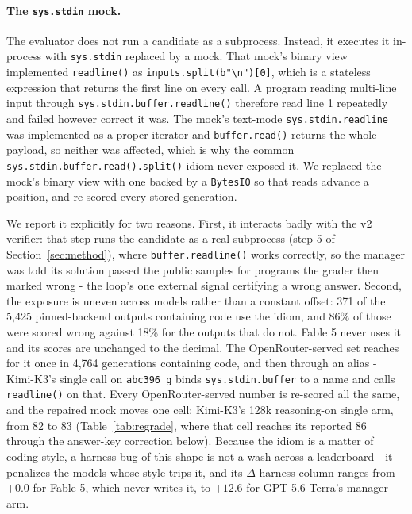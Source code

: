 \documentclass{article}
\begin{document}
\paragraph{The \texttt{sys.stdin} mock.} The evaluator does not run a candidate as a subprocess.
Instead, it executes it in-process with
\texttt{sys.stdin} replaced by a mock. That mock's binary view implemented \texttt{readline()} as
\texttt{inputs.split(b"\textbackslash n")[0]}, which is a stateless expression that returns the
first line on every call. A program reading multi-line input through
\texttt{sys.stdin.buffer.readline()} therefore read line 1 repeatedly and failed however correct it
was. The mock's text-mode \texttt{sys.stdin.readline} was implemented as a proper iterator and
\texttt{buffer.read()} returns the whole payload, so neither was affected, which is why the
common \texttt{sys.stdin.buffer.read().split()} idiom never exposed it. We replaced the mock's
binary view with one backed by a \texttt{BytesIO} so that reads advance a position, and re-scored
every stored generation.

We report it explicitly for two reasons. First, it interacts badly with the v2 verifier: that step
runs the candidate as a real subprocess (step 5 of Section~\ref{sec:method}), where
\texttt{buffer.readline()} works correctly, so the manager was told its solution passed the public
samples for programs the grader then marked wrong - the loop's one external signal certifying a
wrong answer. Second, the exposure is uneven across models rather than a constant offset: 371 of the
5{,}425 pinned-backend outputs containing code use the idiom, and 86\% of those were scored wrong
against 18\% for the outputs that do not. Fable 5 never uses it and its scores are unchanged to the
decimal. The OpenRouter-served set reaches for it once in 4{,}764 generations containing code, and
then through an alias - Kimi-K3's single call on \texttt{abc396\_g} binds
\texttt{sys.stdin.buffer} to a name and calls \texttt{readline()} on that. Every OpenRouter-served
number is re-scored all the same, and the repaired mock moves one cell: Kimi-K3's 128k
reasoning-on single arm, from 82 to 83 (Table~\ref{tab:regrade}, where that cell reaches its
reported 86 through the answer-key correction below). Because the idiom is a matter of coding
style, a harness bug of this shape is not a wash across a leaderboard - it penalizes the models
whose style trips it, and its $\Delta$ harness column ranges from $+0.0$ for Fable 5, which
never writes it, to $+12.6$ for GPT-5.6-Terra's manager arm.
\end{document}

